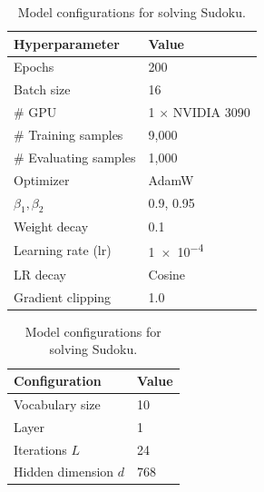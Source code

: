 \begin{table}[htbp]
    \centering
    \begin{minipage}[t]{0.49\textwidth}
    \centering
    \caption{Training recipe for solving Sudoku.}
    \label{tab:training recipe for solving Sudoku}
        \begin{tabular}{ll}
            \toprule
            \textbf{Hyperparameter}  & \textbf{Value} \\
            \midrule
            Epochs  &  200 \\
            Batch size & 16 \\
            $\#$ GPU & 1 $\times$ NVIDIA 3090 \\
            $\#$ Training samples & 9{,}000 \\
            $\#$ Evaluating samples & 1{,}000 \\
            Optimizer & AdamW \\
            $\beta_1, \beta_2$ & 0.9, 0.95 \\
            Weight decay & 0.1  \\
            Learning rate (lr) & \num{1e-4}\\
            LR decay & Cosine \\
            Gradient clipping & 1.0 \\
            \bottomrule
        \end{tabular}
    \end{minipage}%
    \hfill
    \begin{minipage}[t]{0.49\textwidth}
    \centering
    \caption{Model configurations for solving Sudoku.}
    \vspace{-4pt}
    \label{tab:model configuration for solving Sudoku} 
        \begin{tabular}{ll}
            \toprule
            \textbf{Configuration}  & \textbf{Value} \\
            \midrule
            Vocabulary size & 10 \\
            Layer  &  1 \\
            Iterations $L$ & 24 \\
            Hidden dimension $d$ & 768 \\

\end{tabular}
\end{minipage}
\end{table}
